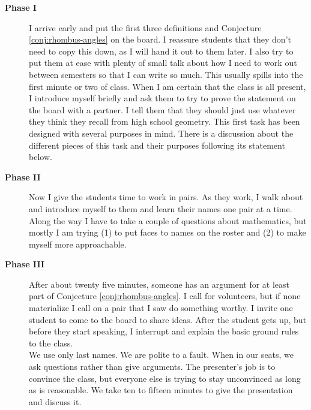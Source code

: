 \begin{annotation}
\begin{description}
\item[\textbf{Phase I}] I arrive early and put the first three definitions and Conjecture \ref{conj:rhombus-angles} on the board.
I reassure students that they don't need to copy this down, as I will hand it out to them later.
I also try to put them at ease with plenty of small talk about how I need to work out between semesters so that I can write so much.
This usually spills into the first minute or two of class.
When I am certain that the class is all present, I introduce myself briefly and ask them to try to prove the statement on the board with a partner. 
I tell them that they should just use whatever they think they recall from high school geometry.
This first task has been designed with several purposes in mind. There is a discussion about the different pieces of this task and their purposes following its statement below.\\[.1in]

\item[\textbf{Phase II}] Now I give the students time to work in pairs.
As they work, I walk about and introduce myself to them and learn their names one pair at a time.
Along the way I have to take a couple of questions about mathematics, but mostly I am trying (1) to put faces to names on the roster and (2) to make myself more approachable.\\[.1in]

\item[\textbf{Phase III}] After about twenty five minutes, someone has an argument for at least part of Conjecture \ref{conj:rhombus-angles}.
I call for volunteers, but if none materialize I call on a pair that I saw do something worthy.
I invite one student to come to the board to share ideas.
After the student gets up, but before they start speaking, I interrupt and explain the basic ground rules to the class.\\[.1in]

We use only last names.
We are polite to a fault.
When in our seats, we ask questions rather than give arguments.
The presenter's job is to convince the class, but everyone else is trying to stay unconvinced as long as is reasonable.
We take ten to fifteen minutes to give the presentation and discuss it.\\[.1in]


\end{description}
\end{annotation}
